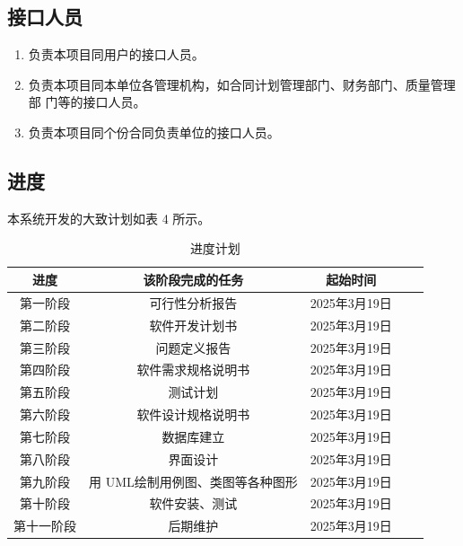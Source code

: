 \documentclass[
    report,     %
    oneside,    %
    UTF8,       %
    zihao=-4    %
]{config} %
\begin{document}
\subsection{接口人员}
\begin{enumerate}[label=(\arabic*)]
\item 负责本项目同用户的接口人员。
\item 负责本项目同本单位各管理机构，如合同计划管理部门、财务部门、质量管理部
门等的接口人员。
\item 负责本项目同个份合同负责单位的接口人员。
\end{enumerate}
\subsection{进度}
本系统开发的大致计划如表 4 所示。
\begin{table}[H] %
    \centering %
    \caption{进度计划} %
    \label{tab:progress} %
    \renewcommand\arraystretch{0.85} %
    \setlength{\tabcolsep}{12pt} %
    \begin{tabular}{ccccc} %
        \toprule[1.5pt] %
        \textbf{进度} & \textbf{该阶段完成的任务} & \textbf{起始时间} \\ %
        \midrule[0.8pt] %
        第一阶段 & 可行性分析报告 & 2025年3月19日 \\ %
        第二阶段 & 软件开发计划书 & 2025年3月19日 \\ %
        第三阶段 & 问题定义报告 & 2025年3月19日 \\ %
        第四阶段 & 软件需求规格说明书 & 2025年3月19日 \\ %
        第五阶段 & 测试计划 & 2025年3月19日 \\ %
        第六阶段 & 软件设计规格说明书 & 2025年3月19日 \\ %
        第七阶段 & 数据库建立 & 2025年3月19日 \\ %
        第八阶段 & 界面设计 & 2025年3月19日 \\ %
        第九阶段 & 用 UML绘制用例图、类图等各种图形 & 2025年3月19日 \\ %
        第十阶段 & 软件安装、测试 & 2025年3月19日 \\ %
        第十一阶段 & 后期维护 & 2025年3月19日 \\ %
        \hline\hline %
    \end{tabular}
\end{table}
\end{document}
